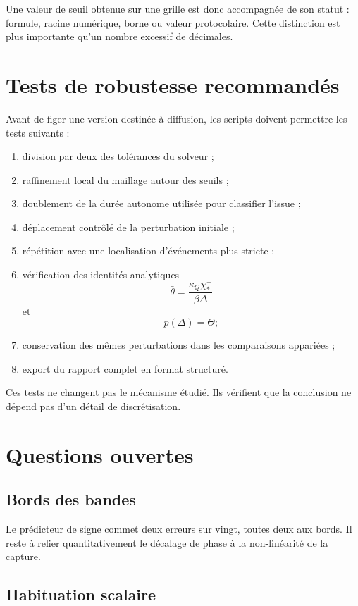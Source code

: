 Une valeur de seuil obtenue sur une grille est donc accompagnée de son
statut : formule, racine numérique, borne ou valeur protocolaire. Cette
distinction est plus importante qu'un nombre excessif de décimales.

\section{Tests de robustesse recommandés}
\label{annexe-num-tests-recommandes}

Avant de figer une version destinée à diffusion, les scripts doivent
permettre les tests suivants :

\begin{enumerate}
\item division par deux des tolérances du solveur ;
\item raffinement local du maillage autour des seuils ;
\item doublement de la durée autonome utilisée pour classifier l'issue ;
\item déplacement contrôlé de la perturbation initiale ;
\item répétition avec une localisation d'événements plus stricte ;
\item vérification des identités analytiques
  \[
  \bar\theta=\frac{\kappa_Q\chi_\ast^-}{\beta\Delta}
  \]
  et
  \[
  p(\Delta)=\Theta;
  \]
\item conservation des mêmes perturbations dans les comparaisons appariées ;
\item export du rapport complet en format structuré.
\end{enumerate}

Ces tests ne changent pas le mécanisme étudié. Ils vérifient que la
conclusion ne dépend pas d'un détail de discrétisation.

\section{Questions ouvertes}
\label{annexe-num-questions-ouvertes}

\subsection{Bords des bandes}

Le prédicteur de signe commet deux erreurs sur vingt, toutes deux aux
bords. Il reste à relier quantitativement le décalage de phase à la
non-linéarité de la capture.

\subsection{Habituation scalaire}

